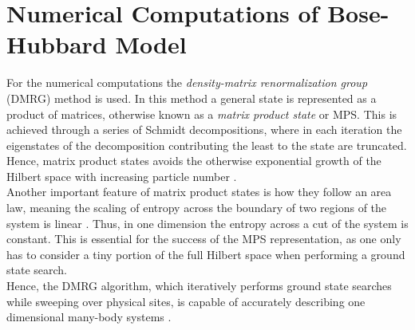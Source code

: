 \chapter{Numerical Computations of Bose-Hubbard Model}
For the numerical computations the \textit{density-matrix renormalization group} (DMRG) method is used. In this method a general state is represented as a product of matrices, otherwise known as a \textit{matrix product state} or MPS. This is achieved through a series of Schmidt decompositions, where in each iteration the eigenstates of the decomposition contributing the least to the state are truncated. Hence, matrix product states avoids the otherwise exponential growth of the Hilbert space with increasing particle number \cite{schollwock}.\\
Another important feature of matrix product states is how they follow an area law, meaning the scaling of entropy across the boundary of two regions of the system is linear \cite{Cramer}. Thus, in one dimension the entropy across a cut of the system is constant. This is essential for the success of the MPS representation, as one only has to consider a tiny portion of the full Hilbert space when performing a ground state search.\\
Hence, the DMRG algorithm, which iteratively performs ground state searches while sweeping over physical sites, is capable of accurately describing one dimensional many-body systems \cite{Kuhner2000, Kollath2004}. 


